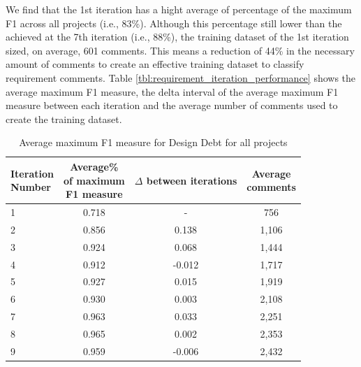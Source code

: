We find that the 1st iteration has a hight average of percentage of the maximum F1 across all projects (i.e., 83\%). Although this percentage still lower than the achieved at the 7th iteration (i.e., 88\%), the training dataset of the 1st iteration sized, on average, 601 \SATD comments. This means a reduction of 44\% in the necessary amount of comments to create an effective training dataset to classify requirement \SATD comments. Table \ref{tbl:requirement_iteration_performance} shows the average maximum F1 measure, the delta interval of the average maximum F1 measure between each iteration and the average number of comments used to create the training dataset. 

\begin{table}[!thb]
    \begin{center}
        \caption{Average maximum F1 measure for Design Debt  for all projects}
        \label{tbl:design_iteration_performance}
        \begin{tabular}{l| c c c}
        \toprule
        \thead{Iteration\\Number} & \thead{Average\%\\of maximum\\F1 measure} & \thead{$\Delta$\\between\\iterations} & \thead{Average\\comments} \\
        \midrule
         1  &  0.718 &  -      & 756   \\  
         2  &  0.856 &  0.138  & 1,106 \\  
         3  &  0.924 &  0.068  & 1,444 \\  
         4  &  0.912 & -0.012  & 1,717 \\  
         5  &  0.927 &  0.015  & 1,919 \\  
         6  &  0.930 &  0.003  & 2,108 \\  
         7  &  0.963 &  0.033  & 2,251 \\  
         8  &  0.965 &  0.002  & 2,353 \\  
         9  &  0.959 & -0.006  & 2,432 \\  
        \bottomrule
        \end{tabular}
    \end{center}    
\end{table}

